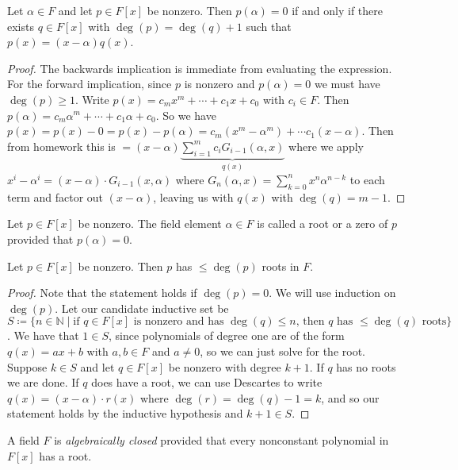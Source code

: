 \begin{lemma}[Descartes]
    Let \(\alpha  \in F\) and let \(p \in F[x]\) be nonzero. Then \(p(\alpha )=0\) if and only if there exists \(q \in F[x]\) with \(\deg(p)=\deg(q)+1\) such that \(p(x)=(x-\alpha )q(x)\).
\end{lemma}
\begin{proof}
    The backwards implication is immediate from evaluating the expression. For the forward implication, since \(p\) is nonzero and \(p(\alpha )=0\) we must have \(\deg(p)\geq 1\). Write \(p(x)=c_m x^m + \cdots + c_1 x + c_0\) with \(c_i \in F\). Then \(p(\alpha )=c_m \alpha^m + \cdots + c_1 \alpha + c_0\). So we have \(p(x) = p(x)-0 = p(x)-p(\alpha ) = c_m(x^m - \alpha ^m) + \cdots c_1 (x-\alpha )\). Then from homework this is \(=(x-\alpha )\underbrace{\sum_{i=1}^{m} c_i G_{i-1}(\alpha ,x)}_{q(x)}  \)  where we apply \(x^i - \alpha ^i = (x-\alpha ) \cdot  G_{i-1}(x,\alpha ) \) where \(G_{n} (\alpha ,x)= \sum_{k=0}^{n} x^n \alpha ^{n -k} \) to each term and factor out \((x-\alpha )\), leaving us with \(q(x)\) with \(\deg(q)=m-1\).
\end{proof}
\begin{definition}
    Let \(p \in F[x]\) be nonzero. The field element \(\alpha \in F\) is called a root or a zero of \(p\) provided that \(p(\alpha )= 0\).
\end{definition}
\begin{corollary}
    Let \(p \in F[x]\) be nonzero. Then \(p\) has \(\leq \deg(p)\) roots in \(F\).   
\end{corollary}
\begin{proof}
    Note that the statement holds if \(\deg(p)=0\). We will use induction on \(\deg(p)\). Let our candidate inductive set be \(S\coloneqq \{ n \in \mathbb{N} \mid \text{if } q \in F[x] \text{ is nonzero and has } \deg(q)\leq n \text{, then } q \text{ has } \leq \deg(q) \text{ roots}\} \). We have that \(1 \in S\), since polynomials of degree one are of the form \(q(x)=ax+b\) with \(a, b \in F\) and \(a \neq 0\), so we can just solve for the root. Suppose \(k \in S\) and let \(q \in F[x]\) be nonzero with degree \(k+1\). If \(q\) has no roots we are done. If \(q\) does have a root, we can use Descartes to write \(q(x) = (x-\alpha )\cdot r(x)\) where \(\deg(r) = \deg(q)-1 =k\), and so our statement holds by the inductive hypothesis and \(k+1 \in S\).
\end{proof}
\begin{lingo}
    A field \(F\) is \emph{algebraically closed} provided that every nonconstant polynomial in \(F[x]\) has a root.   
\end{lingo}
